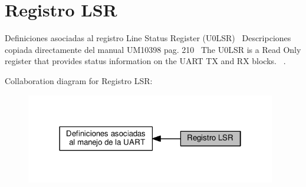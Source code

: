 \hypertarget{group___r_e_g_i_s_t_r_o___l_s_r}{}\section{Registro L\+SR}
\label{group___r_e_g_i_s_t_r_o___l_s_r}


Definiciones asociadas al registro Line Status Register (U0\+L\+SR)~\newline
 Descripciones copiada directamente del manual U\+M10398 pag. 210~\newline
 The U0\+L\+SR is a Read Only register that provides status information on the U\+A\+RT TX and RX blocks.~\newline
.  


Collaboration diagram for Registro L\+SR\+:\nopagebreak
\begin{figure}[H]
\begin{center}
\leavevmode
\includegraphics[width=310pt]{group___r_e_g_i_s_t_r_o___l_s_r}
\end{center}
\end{figure}
